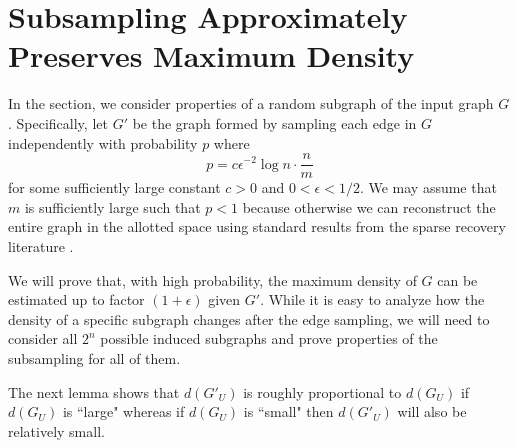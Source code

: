 \documentclass[11pt]{article}
\begin{document}
\section{Subsampling Approximately Preserves Maximum Density}\label{sec:subsample}
In the section, we consider properties of a random subgraph of the input graph $G$.
Specifically, let $G'$ be the graph formed by sampling each edge in $G$ independently with probability $p$ where
\[p = c \epsilon^{-2} \log n \cdot \frac{n}{m}\]
for some sufficiently large constant $c>0$ and $0<\epsilon<1/2$. We may assume that $m$ is sufficiently large such that $p<1$ because otherwise we can reconstruct the entire graph in the allotted space using standard results from the sparse recovery literature \cite{GilbertI10}. 


We will prove that, with high probability, the maximum density  of $G$ can be estimated up to factor $(1+\epsilon)$ given $G'$. While it is easy to analyze how the density of a specific subgraph changes after the edge sampling, we will need to consider all $2^n$ possible induced subgraphs and prove properties of the subsampling for all of them. 

The next lemma shows that $d(G'_U)$ is roughly proportional to $d(G_U)$ if $d(G_U)$ is ``large" whereas if $d(G_U)$ is ``small" then $d(G'_U)$ will also be relatively small.
\end{document}
